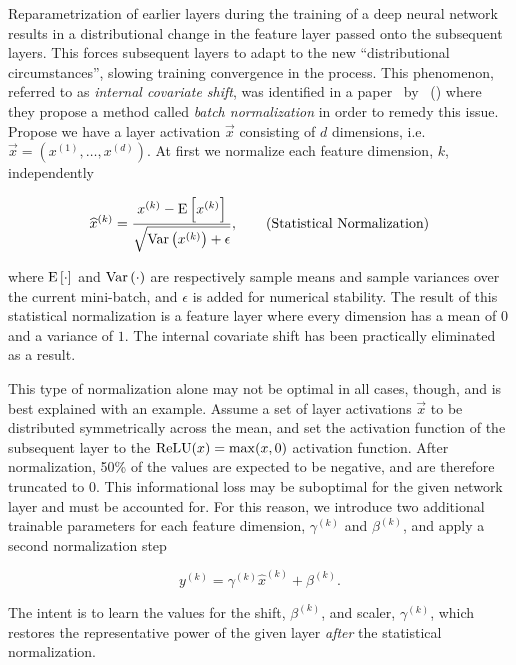 Reparametrization of earlier layers during the training of a deep neural network results in a distributional change in the feature layer passed onto the subsequent layers.
This forces subsequent layers to adapt to the new \enquote{distributional circumstances}, slowing training convergence in the process.
This phenomenon, referred to as \textit{internal covariate shift}, was identified in a paper~\cite{batch-normalization} by \citeauthor{batch-normalization}~(\citeyear{batch-normalization}) where they propose a method called \textit{batch normalization} in order to remedy this issue.
Propose we have a layer activation $\vec{x}$ consisting of $d$ dimensions, i.e. $\vec{x} = (x^{(1)}, \ldots, x^{(d)})$.
At first we normalize each feature dimension, $k$, independently

\begin{equation*}
  \widehat{x}^{(k)}
  =
  \frac{
    x^{(k)} - \mathrm{E} \left[x^{(k)} \right]
  }{
    \sqrt{\mathrm{Var} \left(x^{(k)} \right) + \epsilon}
  },
  \tag{Statistical Normalization}
\end{equation*}

where $\mathrm{E} \left[\cdot \right]$ and $\mathrm{Var} \left(\cdot \right)$ are respectively sample means and sample variances over the current mini-batch, and $\epsilon$ is added for numerical stability.
The result of this statistical normalization is a feature layer where every dimension has a mean of $0$ and a variance of $1$.
The internal covariate shift has been practically eliminated as a result.

This type of normalization alone may not be optimal in all cases, though, and is best explained with an example.
Assume a set of layer activations $\vec{x}$ to be distributed symmetrically across the mean, and set the activation function of the subsequent layer to the $\mathrm{ReLU}(x) = \max(x,0)$ activation function.
After normalization, 50\% of the values are expected to be negative, and are therefore truncated to $0$.
This informational loss may be suboptimal for the given network layer and must be accounted for.
For this reason, we introduce two additional trainable parameters for each feature dimension, $\gamma^{(k)}$ and $\beta^{(k)}$, and apply a second normalization step

\begin{equation*}
  y^{(k)} = \gamma^{(k)} \widehat{x}^{(k)} + \beta^{(k)}.
  \tag{Trainable Normalization}
\end{equation*}

The intent is to learn the values for the shift, $\beta^{(k)}$, and scaler, $\gamma^{(k)}$, which restores the representative power of the given layer \textit{after} the statistical normalization.
